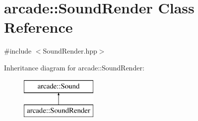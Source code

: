 \hypertarget{classarcade_1_1_sound_render}{\section{arcade\-:\-:Sound\-Render Class Reference}
\label{classarcade_1_1_sound_render}
}


{\ttfamily \#include $<$Sound\-Render.\-hpp$>$}

Inheritance diagram for arcade\-:\-:Sound\-Render\-:\begin{figure}[H]
\begin{center}
\leavevmode
\includegraphics[height=2.000000cm]{classarcade_1_1_sound_render}
\end{center}
\end{figure}
